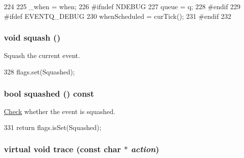 \begin{DoxyCode}
224     {
225         _when = when;
226 #ifndef NDEBUG
227         queue = q;
228 #endif
229 #ifdef EVENTQ_DEBUG
230         whenScheduled = curTick();
231 #endif
232     }
\end{DoxyCode}
\hypertarget{classEvent_a3c68c455d9207edd23ae3bcb7971e653}{
\subsubsection[{squash}]{\setlength{\rightskip}{0pt plus 5cm}void squash ()}}
\label{classEvent_a3c68c455d9207edd23ae3bcb7971e653}


Squash the current event. 


\begin{DoxyCode}
328 { flags.set(Squashed); }
\end{DoxyCode}
\hypertarget{classEvent_af355b62f22559090d6e3047bdf83f24f}{
\subsubsection[{squashed}]{\setlength{\rightskip}{0pt plus 5cm}bool squashed () const}}
\label{classEvent_af355b62f22559090d6e3047bdf83f24f}


\hyperlink{classCheck}{Check} whether the event is squashed. 


\begin{DoxyCode}
331 { return flags.isSet(Squashed); }
\end{DoxyCode}
\hypertarget{classEvent_ac7983455be765710922308f521703584}{
\subsubsection[{trace}]{\setlength{\rightskip}{0pt plus 5cm}virtual void trace (const char $\ast$ {\em action})}}
\label{classEvent_ac7983455be765710922308f521703584}


